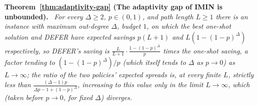 \documentclass[preprint,11pt]{elsarticle}
\theoremstyle{definition}
\theoremstyle{remark}
\newenvironment{repeattheorem}[1][]{\par\medskip\noindent\textbf{#1.}\ \itshape}{\par\medskip}
\begin{document}
\begin{repeattheorem}[Theorem~\ref{thm:adaptivity-gap} (The adaptivity gap of IMIN is unbounded)]
For every $\Delta\ge 2$, $p\in(0,1)$, and path length $L\ge1$ there is an
instance with maximum out-degree $\Delta$, budget $1$, on which the best
one-shot solution and DEFER have expected savings $p(L+1)$ and
$L(1-(1-p)^\Delta)$ respectively, so DEFER's saving is
$\frac{L}{L+1}\cdot\frac{1-(1-p)^\Delta}{p}$ times the one-shot saving, a
factor tending to $(1-(1-p)^\Delta)/p$ (which itself tends to $\Delta$ as
$p\to0$) as $L\to\infty$; the ratio of the two policies' expected spreads
is, at every finite $L$, strictly \emph{less} than
$\frac{(\Delta-1)p}{\Delta p-1+(1-p)^\Delta}$, increasing to this value only
in the limit $L\to\infty$, which (taken before $p\to0$, for fixed $\Delta$)
diverges.
\end{repeattheorem}
\end{document}
